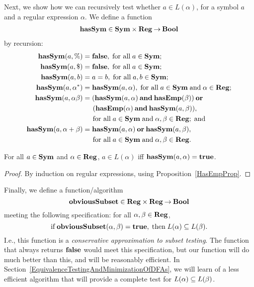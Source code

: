 Next, we show how we can recursively test whether $a\in L(\alpha)$, for
a symbol $a$ and a regular expression $\alpha$.  We define a function
%
%
%
\begin{gather*}
\mathbf{hasSym}\in\mathbf{Sym}\times\mathbf{Reg}\mathbin{\to}\mathbf{Bool}
\end{gather*}
 by recursion:
\begin{align*}
\mathbf{hasSym}(a, \%) &= \mathbf{false} , \;\allowbreak\mbox{for all}\allowbreak\; a\in\mathbf{Sym}; \\
\mathbf{hasSym}(a, \$) &= \mathbf{false} , \;\allowbreak\mbox{for all}\allowbreak\; a\in\mathbf{Sym}; \\
\mathbf{hasSym}(a, b) &= a = b , \;\allowbreak\mbox{for all}\allowbreak\; a,b\in\mathbf{Sym}; \\
\mathbf{hasSym}(a, \alpha^*) &= \mathbf{hasSym}(a, \alpha) , \;\allowbreak\mbox{for all}\allowbreak\;
a\in\mathbf{Sym}\;\allowbreak\mbox{and}\allowbreak\;\alpha\in\mathbf{Reg} ; \\
\mathbf{hasSym}(a, \alpha\beta) &=
(\mathbf{hasSym}(a, \alpha)\mathbin{\mathbf{and}} \mathbf{hasEmp}(\beta)) \mathbin{\mathbf{or}} {} \\
&\quad\;\, (\mathbf{hasEmp}(\alpha)\mathbin{\mathbf{and}} \mathbf{hasSym}(a, \beta)) , \\
&\quad\, \;\allowbreak\mbox{for all}\allowbreak\; a\in\mathbf{Sym}\;\allowbreak\mbox{and}\allowbreak\;\alpha,\beta\in\mathbf{Reg} ; \;\allowbreak\mbox{and}\allowbreak\; \\
\mathbf{hasSym}(a, \alpha+\beta) &=
\mathbf{hasSym}(a, \alpha)\mathbin{\mathbf{or}}\mathbf{hasSym}(a, \beta), \\
&\quad\, \;\allowbreak\mbox{for all}\allowbreak\; a\in\mathbf{Sym}\;\allowbreak\mbox{and}\allowbreak\;\alpha,\beta\in\mathbf{Reg} .
\end{align*}

\begin{proposition}
\label{HasSymProp}
For all $a\in\mathbf{Sym}$ and $\alpha\in\mathbf{Reg}$,
$a\in L(\alpha)$ iff $\mathbf{hasSym}(a,\alpha) = \mathbf{true}$.
\end{proposition}

\begin{proof}
By induction on regular expressions, using Proposition~\ref{HasEmpProp}.
\end{proof}

Finally, we define a function/algorithm
%
%
%
\begin{displaymath}
\mathbf{obviousSubset}\in\mathbf{Reg}\times\mathbf{Reg}\mathbin{\to}\mathbf{Bool}
\end{displaymath}
meeting the following specification: for all $\alpha,\beta\in\mathbf{Reg}$,
\begin{displaymath}
\allowbreak\mbox{if}\allowbreak\; \mathbf{obviousSubset}(\alpha,\beta)=\mathbf{true},
\;\allowbreak\mbox{then}\allowbreak\; L(\alpha)\subseteq L(\beta) .
\end{displaymath}
I.e., this function is a \emph{conservative approximation to subset testing}.
%
%
The function that always returns $\mathbf{false}$
would meet this specification, but our function will do much better
than this, and will be reasonably efficient. In
Section~\ref{EquivalenceTestingAndMinimizationOfDFAs},
we will learn of a less efficient algorithm that will provide a complete test
for $L(\alpha)\subseteq L(\beta)$.

